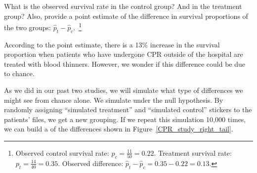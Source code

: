 \begin{exercise}
What is the observed survival rate in the control group? And in the treatment group? Also, provide a point estimate of the difference in survival proportions of the two groups: $\hat{p}_t - \hat{p}_c$.~\footnote{Observed control survival rate: $p_c = \frac{11}{50} = 0.22$. Treatment survival rate: $p_t = \frac{14}{40} = 0.35$. Observed difference: $\hat{p}_t - \hat{p}_c = 0.35 - 0.22 = 0.13$.}
\end{exercise}

According to the point estimate, there is a 13\% increase in the survival proportion when patients who have undergone CPR outside of the hospital are treated with blood thinners. However, we wonder if this difference could be due to chance.

As we did in our past two studies, we will simulate what type of differences we might see from chance alone. We simulate under the null hypothesis. By randomly assigning ``simulated treatment'' and ``simulated control'' stickers to the patients' files, we get a new grouping. If we repeat this simulation 10,000 times, we can build a  of the differences shown in Figure~\ref{CPR_study_right_tail}.



